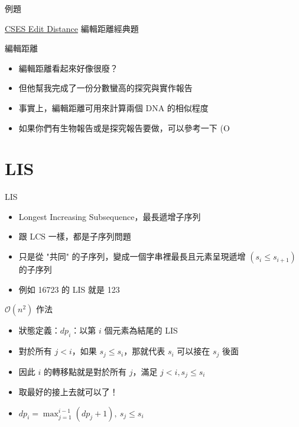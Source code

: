 \documentclass[aspectratio=169]{beamer}
\begin{document}
    \begin{frame}{例題}
        \begin{block}{\href{https://cses.fi/problemset/task/1639}{CSES Edit Distance}}
            編輯距離經典題
        \end{block}
    \end{frame}

    \begin{frame}{編輯距離}
        \begin{itemize}
            \item<1-> 編輯距離看起來好像很廢？
            \item<2-> 但他幫我完成了一份分數蠻高的探究與實作報告
            \item<3-> 事實上，編輯距離可用來計算兩個 DNA 的相似程度
            \item<4-> 如果你們有生物報告或是探究報告要做，可以參考一下 (O
        \end{itemize}
    \end{frame}

    \section{LIS}

    \begin{frame}{LIS}
        \begin{itemize}
            \item Longest Increasing Subsequence，最長遞增子序列
            \item 跟 LCS 一樣，都是子序列問題
            \item 只是從 "共同" 的子序列，變成一個字串裡最長且元素呈現遞增 $(s_i \le s_{i + 1})$ 的子序列
            \item 例如 16723 的 LIS 就是 123
        \end{itemize}
    \end{frame}

    \begin{frame}{$\mathcal{O}(n^2)$ 作法}
        \begin{itemize}
            \item<1-> 狀態定義：$dp_{i}$：以第 $i$ 個元素為結尾的 LIS
            \item<2-> 對於所有 $j < i$，如果 $s_{j} \le s_{i}$，那就代表 $s_{i}$ 可以接在 $s_{j}$ 後面
            \item<3-> 因此 $i$ 的轉移點就是對於所有 $j$，滿足 $j < i, s_{j} \le s_{i}$
            \item<4-> 取最好的接上去就可以了！
            \item<5-> $dp_{i} = \displaystyle\max_{j = 1}^{i - 1}(dp_{j} + 1),\ s_{j} \le s_{i}$
        \end{itemize}
    \end{frame}
\end{document}
